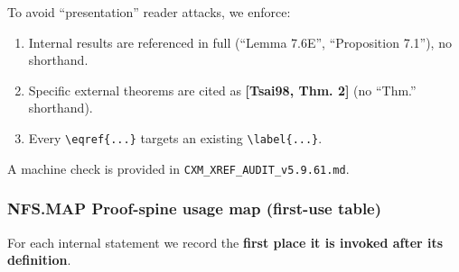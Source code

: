 \documentclass[
  11pt,
]{article}
\providecommand{\tightlist}{%
  \setlength{\itemsep}{0pt}\setlength{\parskip}{0pt}}
\begin{document}
To avoid ``presentation'' reader attacks, we enforce:

\begin{enumerate}
\def\labelenumi{\arabic{enumi}.}
\tightlist
\item
  Internal results are referenced in full (``Lemma 7.6E'', ``Proposition 7.1''), no shorthand.
\item
  Specific external theorems are cited as \textbf{{[}Tsai98, Thm. 2{]}} (no ``Thm.'' shorthand).
\item
  Every \texttt{\textbackslash{}eqref\{...\}} targets an existing \texttt{\textbackslash{}label\{...\}}.
\end{enumerate}

A machine check is provided in \texttt{CXM\_XREF\_AUDIT\_v5.9.61.md}.

\hypertarget{nfs.map-proof-spine-usage-map-first-use-table}{%
\subsubsection{NFS.MAP Proof-spine usage map (first-use table)}\label{nfs.map-proof-spine-usage-map-first-use-table}}

For each internal statement we record the \textbf{first place it is invoked after its definition}.
\end{document}
